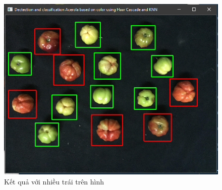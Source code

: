 \documentclass[12pt,a4paper]{article}
\begin{document}
\begin{center}
    \begin{figure}[htp]
    \begin{center}
    \includegraphics[scale=.8]{Images/f2}
    \end{center}
    \caption{Kết quả với nhiều trái trên hình}
    \end{figure}
\end{center}
\pagebreak
\end{document}
